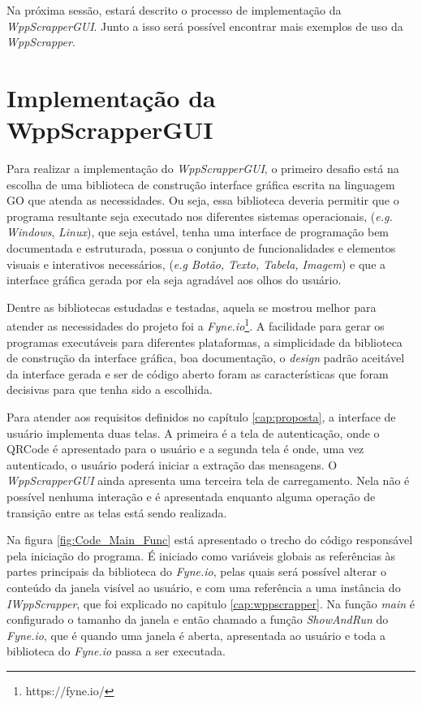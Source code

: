 Na próxima sessão, estará descrito o processo de implementação da \textit{WppScrapperGUI}. Junto a isso será possível encontrar mais exemplos de uso da \textit{WppScrapper}.

\section{Implementação da WppScrapperGUI}

Para realizar a implementação do \textit{WppScrapperGUI}, o primeiro desafio está na escolha de uma biblioteca de construção interface gráfica escrita na linguagem GO que atenda as necessidades. Ou seja, essa biblioteca deveria permitir que o programa resultante seja executado nos diferentes sistemas operacionais, (\textit{e.g.} \textit{Windows}, \textit{Linux}), que seja estável, tenha uma interface de programação bem documentada e estruturada, possua o conjunto de funcionalidades e elementos visuais e interativos necessários, (\textit{e.g Botão, Texto, Tabela, Imagem}) e que a interface gráfica gerada por ela seja agradável aos olhos do usuário.

Dentre as bibliotecas estudadas e testadas, aquela se mostrou melhor para atender as necessidades do projeto foi a \textit{Fyne.io}\footnote{https://fyne.io/}. A facilidade para gerar os programas executáveis para diferentes plataformas, a simplicidade da biblioteca de construção da interface gráfica, boa documentação, o \textit{design} padrão aceitável da interface gerada e ser de código aberto foram as características que foram decisivas para que tenha sido a escolhida.

Para atender aos requisitos definidos no capítulo \ref{cap:proposta}, a interface de usuário implementa duas telas. A primeira é a tela de autenticação, onde o QRCode é apresentado para o usuário e a segunda tela é onde, uma vez autenticado, o usuário poderá iniciar a extração das mensagens. O \textit{WppScrapperGUI} ainda apresenta uma terceira tela de carregamento. Nela não é possível nenhuma interação e é apresentada enquanto alguma operação de transição entre as telas está sendo realizada.

Na figura \ref{fig:Code_Main_Func} está apresentado o trecho do código responsável pela iniciação do programa. É iniciado como variáveis globais as referências às partes principais da biblioteca do \textit{Fyne.io}, pelas quais será possível alterar o conteúdo da janela visível ao usuário, e com uma referência a uma instância do \textit{IWppScrapper}, que foi explicado no capitulo \ref{cap:wppscrapper}. Na função \textit{main} é configurado o tamanho da janela e então chamado a função \textit{ShowAndRun} do \textit{Fyne.io}, que é quando uma janela é aberta, apresentada ao usuário e toda a biblioteca do \textit{Fyne.io} passa a ser executada.

